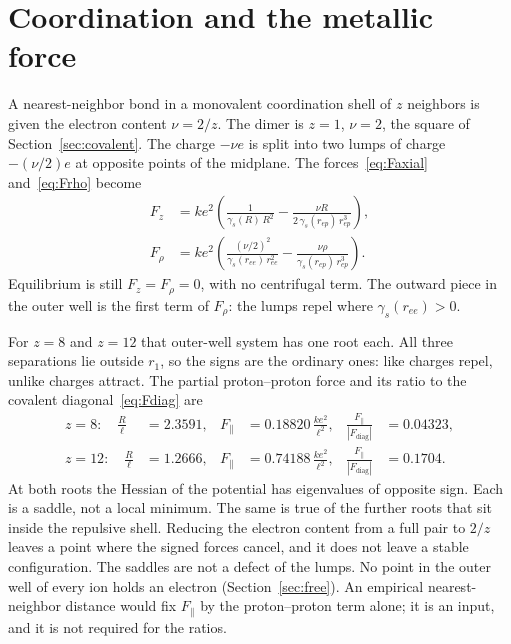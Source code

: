 \documentclass[a4paper]{article}
\begin{document}
\section{Coordination and the metallic force}
\label{sec:metal}

A nearest-neighbor bond in a monovalent coordination shell of \(z\) neighbors is given the electron content \(\nu=2/z\). The dimer is \(z=1\), \(\nu=2\), the square of Section~\ref{sec:covalent}. The charge \(-\nu e\) is split into two lumps of charge \(-(\nu/2)e\) at opposite points of the midplane. The forces~\eqref{eq:Faxial} and~\eqref{eq:Frho} become
\begin{align}
F_z
  &=k e^{2}\left(
    \frac{1}{\gamma_s(R)\,R^{2}}
    -\frac{\nu R}{2\,\gamma_s(r_{ep})\,r_{ep}^{3}}
  \right),
\label{eq:Fznu}\\
F_{\rho}
  &=k e^{2}\left(
    \frac{(\nu/2)^{2}}{\gamma_s(r_{ee})\,r_{ee}^{2}}
    -\frac{\nu\rho}{\gamma_s(r_{ep})\,r_{ep}^{3}}
  \right).
\end{align}
Equilibrium is still \(F_z=F_{\rho}=0\), with no centrifugal term. The outward piece in the outer well is the first term of \(F_{\rho}\): the lumps repel where \(\gamma_s(r_{ee})>0\).

For \(z=8\) and \(z=12\) that outer-well system has one root each. All three separations lie outside \(r_1\), so the signs are the ordinary ones: like charges repel, unlike charges attract. The partial proton--proton force and its ratio to the covalent diagonal~\eqref{eq:Fdiag} are
\begin{align}
z=8:\quad
\frac{R}{\ell}&=2.3591,&
F_{\parallel}&=0.18820\,\frac{k e^{2}}{\ell^{2}},&
\frac{F_{\parallel}}{|F_{\mathrm{diag}}|}&=0.04323,
\label{eq:ratio8}\\
z=12:\quad
\frac{R}{\ell}&=1.2666,&
F_{\parallel}&=0.74188\,\frac{k e^{2}}{\ell^{2}},&
\frac{F_{\parallel}}{|F_{\mathrm{diag}}|}&=0.1704.
\label{eq:ratio12}
\end{align}
At both roots the Hessian of the potential has eigenvalues of opposite sign. Each is a saddle, not a local minimum. The same is true of the further roots that sit inside the repulsive shell. Reducing the electron content from a full pair to \(2/z\) leaves a point where the signed forces cancel, and it does not leave a stable configuration. The saddles are not a defect of the lumps. No point in the outer well of every ion holds an electron (Section~\ref{sec:free}). An empirical nearest-neighbor distance would fix \(F_{\parallel}\) by the proton--proton term alone; it is an input, and it is not required for the ratios.
\end{document}
